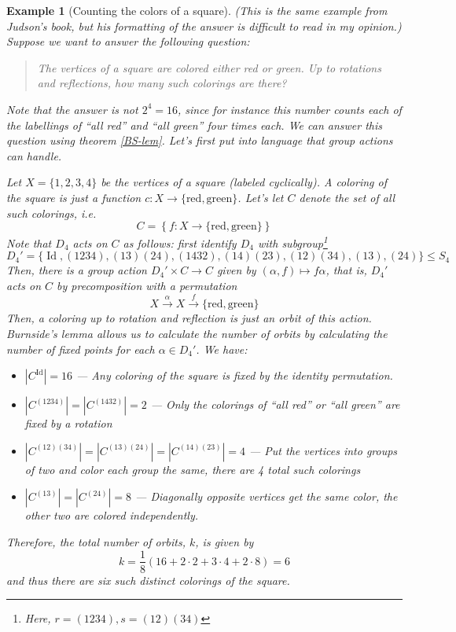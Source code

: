 \documentclass[12pt]{article}
\numberwithin{equation}{subsection}
\theoremstyle{note}
\newtheorem{example}[subsection]{Example}
\newcommand{\Id}{\operatorname{Id}}
\begin{document}
\begin{example}[Counting the colors of a square]
	(This is the same example from Judson's book, but his formatting of the answer is difficult to read in my opinion.) Suppose we want to answer the following question: 
	
	\begin{quote} \textit{The vertices of a square are colored either red or green. Up to rotations and reflections, how many such colorings are there?}\end{quote}
	
	Note that the answer is not $2^4=16$, since for instance this number counts each of the labellings of ``all red'' and ``all green'' four times each. We can answer this question using theorem \ref{BS-lem}. Let's first put into language that group actions can handle. 
	
	Let $X=\{1,2,3,4\}$ be the vertices of a square (labeled cyclically). A \textit{coloring} of the square is just a function $c\colon X\to \{ \text{red}, \text{green}\}$. Let's let $C$ denote the set of all such colorings, i.e. \[ C=\left\{ f\colon X\to \{\text{red}, \text{green}\}\right\}\] Note that $D_4$ acts on $C$ as follows: first identify $D_4$ with subgroup\footnote{Here, $r=(1234), s=(12)(34)$} \[D_4'=\{\Id, (1234), (13)(24), (1432), (14)(23), (12)(34), (13), (24)\}\leq S_4\] Then, there is a group action $D_4'\times C\to C$ given by $(\alpha, f)\mapsto f\alpha$, that is, $D_4'$ acts on $C$ by \textit{precomposition} with a permutation \[ X\xrightarrow{\;\alpha\;} X\xrightarrow{\;f\;} \{ \text{red}, \text{green}\}\] Then, a coloring \textit{up to rotation and reflection} is just an \textit{orbit} of this action. Burnside's lemma allows us to calculate the number of orbits by calculating the number of fixed points for each $\alpha\in D_4'$. We have:
	\begin{itemize}
		\item $|C^{\Id}|=16$ --- Any coloring of the square is fixed by the identity permutation.
		\item $|C^{(1234)}|=|C^{(1432)}|=2$ --- Only the colorings of ``all red'' or ``all green'' are fixed by a rotation
		\item $|C^{(12)(34)}|=|C^{(13)(24)}|=|C^{(14)(23)}|=4$ --- Put the vertices into groups of two and color each group the same, there are 4 total such colorings
		\item $|C^{(13)}|=|C^{(24)}|=8$ --- Diagonally opposite vertices get the same color, the other two are colored independently.
	\end{itemize}
	Therefore, the total number of orbits, $k$, is given by \[ k=\dfrac{1}{8}(16+2\cdot2+3\cdot4+2\cdot8)=6\] and thus there are six such distinct colorings of the square. 
\end{example}
\end{document}
